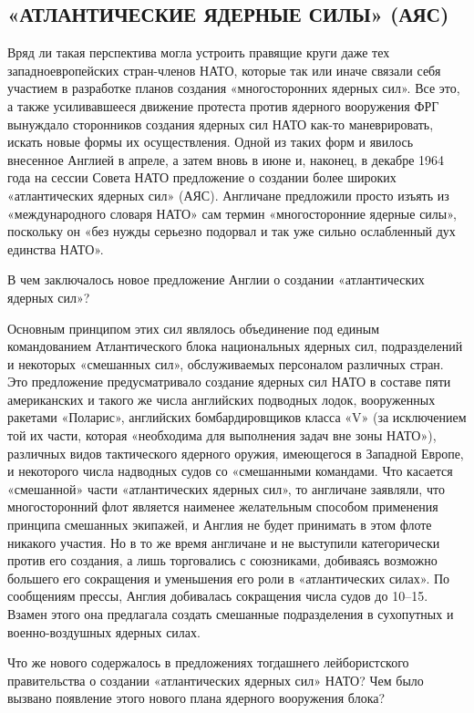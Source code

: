 \documentclass[12pt, a4paper, openany]{book}
\begin{document}
		\subsection[«Атлантические ядерные силы» (АЯС)]{\center «АТЛАНТИЧЕСКИЕ ЯДЕРНЫЕ СИЛЫ» (АЯС)}	
		
		
		Вряд ли такая перспектива могла устроить правящие круги даже тех западноевропейских стран-членов НАТО, которые так или иначе связали себя участием в разработке планов создания «многосторонних ядерных сил». Все это, а также усиливавшееся движение протеста против ядерного вооружения ФРГ вынуждало сторонников создания ядерных сил НАТО как-то маневрировать, искать новые формы их осуществления. Одной из таких форм и явилось внесенное Англией в апреле, а затем вновь в июне и, наконец, в декабре 1964 года на сессии Совета НАТО предложение о создании более широких «атлантических ядерных сил» (АЯС). Англичане предложили просто изъять из «международного словаря НАТО» сам термин «многосторонние ядерные силы», поскольку он «без нужды серьезно подорвал и так уже сильно ослабленный дух единства НАТО».
		
		В чем заключалось новое предложение Англии о создании «атлантических ядерных сил»?
		
		Основным принципом этих сил являлось объединение под единым командованием Атлантического блока национальных ядерных сил, подразделений и некоторых «смешанных сил», обслуживаемых персоналом различных стран. Это предложение предусматривало создание ядерных сил НАТО в составе пяти американских и такого же числа английских подводных лодок, вооруженных ракетами «Поларис», английских бомбардировщиков класса «V» (за исключением той их части, которая «необходима для выполнения задач вне зоны НАТО»), различных видов тактического ядерного оружия, имеющегося в Западной Европе, и некоторого числа надводных судов со «смешанными командами. Что касается «смешанной» части «атлантических ядерных сил», то англичане заявляли, что многосторонний флот является наименее желательным способом применения принципа смешанных экипажей, и Англия не будет принимать в этом флоте никакого участия. Но в то же время англичане и не выступили категорически против его создания, а лишь торговались с союзниками, добиваясь возможно большего его сокращения и уменьшения его роли в «атлантических силах». По сообщениям прессы, Англия добивалась сокращения числа судов до 10–15. Взамен этого она предлагала создать смешанные подразделения в сухопутных и военно-воздушных ядерных силах.
		
		Что же нового содержалось в предложениях тогдашнего лейбористского правительства о создании «атлантических ядерных сил» НАТО? Чем было вызвано появление этого нового плана ядерного вооружения блока?
		
\end{document}
